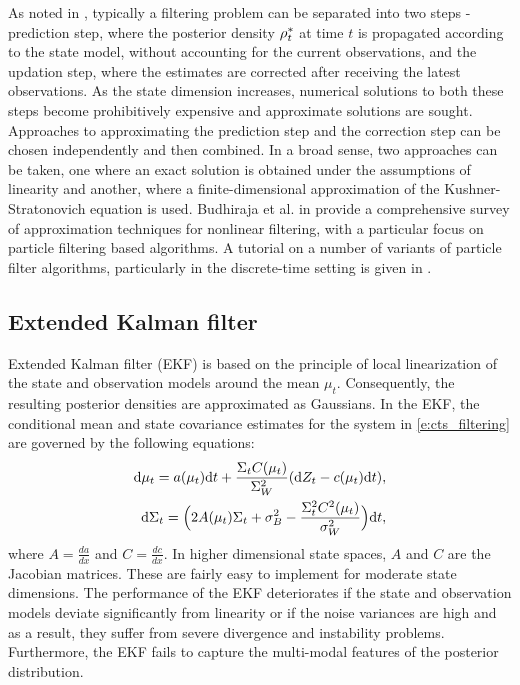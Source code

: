 As noted in , typically a filtering problem can be separated into two steps - prediction step, where the posterior density $\rho^*_t$ at time $t$ is propagated according to the state model, without accounting for the current observations, and the updation step, where the estimates are corrected after receiving the latest observations. As the state dimension increases, numerical solutions to both these steps become prohibitively expensive and approximate solutions are sought. Approaches to approximating the prediction step and the correction step can be chosen independently and then combined. In a broad sense, two approaches can be taken, one where an exact solution is obtained under the assumptions of linearity and another, where a finite-dimensional approximation of the Kushner-Stratonovich equation is used. Budhiraja et al. in \cite{budchelee07} provide a comprehensive survey of approximation techniques for nonlinear filtering, with a particular focus on particle filtering based algorithms. A tutorial on a number of variants of particle filter algorithms, particularly in the discrete-time setting is given in \cite{arumasgorcla02}.
\subsection{Extended Kalman filter}
\label{s:ekf}
Extended Kalman filter (EKF) \cite{jaz70} is based on the principle of local linearization of the state and observation models around the mean $\mu_t$. Consequently, the resulting posterior densities are approximated as Gaussians. In the EKF, the conditional mean and state covariance estimates for the system in \eqref{e:cts_filtering} are governed by the following equations: 
\begin{align}
\ud \mu_t = a(\mu_t) \ud t + \frac{\Sigma_t C(\mu_t)}{\Sigma^2_W} (\ud Z_t - c(\mu_t) \ud t), \\
\ud \Sigma_t = \Bigl(2 A(\mu_t) \Sigma_t  + \sigma^2_B - \frac{\Sigma^2_t C^2(\mu_t)}{\sigma^2_W}\Bigr) \ud t, 
\label{e:ekf}
\end{align}
where $A = \frac{d a}{dx}$ and $C = \frac{d c}{dx}$. In higher dimensional state spaces, $A$ and $C$ are the Jacobian matrices. These are fairly easy to implement for moderate state dimensions. The performance of the EKF deteriorates if the state and observation models deviate significantly from linearity or if the noise variances are high and as a result, they suffer from severe divergence and instability problems. Furthermore, the EKF fails to capture the multi-modal features of the posterior distribution.
